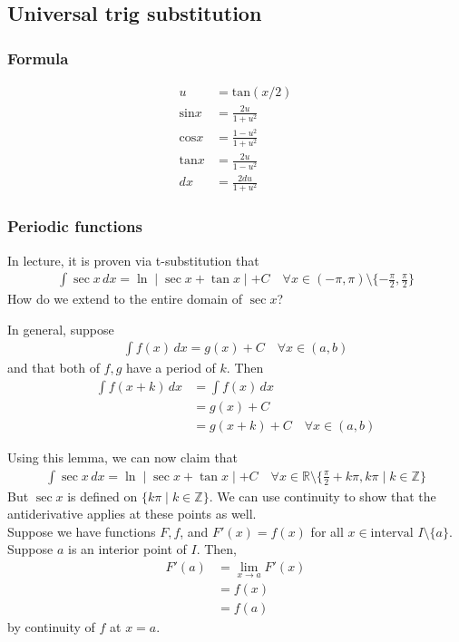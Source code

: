 \documentclass{article}
\begin{document}
\subsection{Universal trig substitution}
\subsubsection{Formula}
\begin{align*}
    u&=\text{tan}(x/2)\\
    \text{sin}x&=\frac{2u}{1+u^2} \\
    \text{cos}x&=\frac{1-u^2}{1+u^2} \\
    \text{tan}x&=\frac{2u}{1-u^2} \\
    dx&=\frac{2du}{1+u^2}
\end{align*}

\subsubsection{Periodic functions}
In lecture, it is proven via t-substitution that 
\begin{align*}
    \int \sec x\, dx=\ln \mid \sec x+\tan x \mid + C \quad \forall x\in (-\pi,\pi)\setminus \{-\frac{\pi}{2},\frac{\pi}{2}\}
\end{align*}
How do we extend to the entire domain of $\sec x$?

In general, suppose 
\begin{align*}
    \int f(x)\, dx=g(x)+C \quad \forall x\in (a,b)
\end{align*}
and that both of $f,g$ have a period of $k$.
Then 
\begin{align*}
    \int f(x+k)\, dx&=\int f(x)\, dx \\
    &=g(x)+C\\
    &=g(x+k)+C\quad \forall x\in (a,b)
\end{align*}

Using this lemma, we can now claim that \begin{align*}
    \int \sec x\, dx=\ln \mid \sec x+\tan x \mid + C \quad \forall x\in \mathbb{R}\setminus \{\frac{\pi}{2} +k\pi,k\pi \mid k\in \mathbb{Z}\}
\end{align*}
But $\sec x$ is defined on $\{k\pi \mid k\in \mathbb{Z}\}$. We can use continuity to show that the antiderivative applies at these points as well.\\
Suppose we have functions $F,f$, and $F'(x)=f(x)$ for all $x\in \text{interval } I\setminus \{a\}$. Suppose $a$ is an interior point of $I$. Then,
\begin{align*}
    F'(a)&=\lim_{x\rightarrow a}F'(x)\\
    &=f(x)\\
    &=f(a)
\end{align*} by continuity of $f$ at $x=a$.
\end{document}
